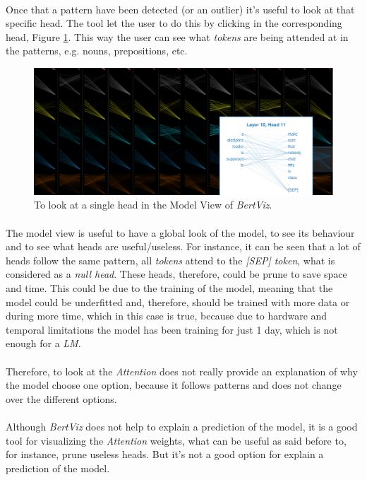 \paragraph{}
Once that a pattern have been detected (or an outlier) it's useful to look at that specific head. The tool let the user to do this by clicking in the corresponding head, Figure \ref{fig:bertviz-model-head}. This way the user can see what \emph{tokens} are being attended at in the patterns, e.g. nouns, prepositions, etc. 
\begin{figure}[!h]
	\centering
	\includegraphics[scale=0.4]{images/bertviz-model-detail}
	\caption{To look at a single head in the Model View of \emph{BertViz}.}
	\label{fig:bertviz-model-head}
\end{figure}
\paragraph{}
The model view is useful to have a global look of the model, to see its behaviour and to see what heads are useful/useless. For instance, it can be seen that a lot of heads follow the same pattern, all \emph{tokens} attend to the \emph{[SEP] token}, what is considered as a \emph{null head}. These heads, therefore, could be prune to save space and time. This could be due to the training of the model, meaning that the model could be underfitted and, therefore, should be trained with more data or during more time, which in this case is true, because due to hardware and temporal limitations the model has been training for just 1 day, which is not enough for a \emph{LM}.
\paragraph{}
Therefore, to look at the \emph{Attention} does not really provide an explanation of why the model choose one option, because it follows patterns and does not change over the different options. 
\paragraph{}
Although \emph{BertViz} does not help to explain a prediction of the model, it is a good tool for visualizing the \emph{Attention} weights, what can be useful as said before to, for instance, prune useless heads. But it's not a good option for explain a prediction of the model.

